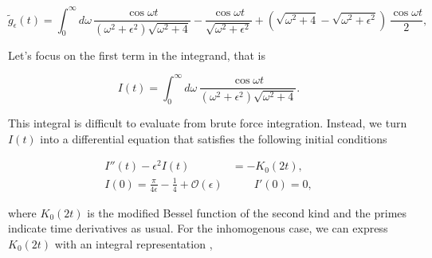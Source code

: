 \documentclass{article}
\numberwithin{equation}{section} %
\begin{document}

\begin{equation}
\tilde{g}_\epsilon(t) = \int^\infty_0 d\omega\, \frac{\cos\omega t}{(\omega^2+\epsilon^2)\sqrt{\omega^2+4}} - \frac{\cos \omega t}{\sqrt{\omega^2+\epsilon^2}} + (\sqrt{\omega^2+4} - \sqrt{\omega^2+\epsilon^2}) \, \frac{\cos \omega t}{2},
\label{g_epsilon}
\end{equation}

Let's focus on the first term in the integrand, that is

\begin{equation}
I(t) = \int^\infty_0 d\omega\, \frac{\cos \omega t}{(\omega^2+\epsilon^2)\sqrt{\omega^2+4}}.
\end{equation}

\noindent This integral is difficult to evaluate from brute force integration. Instead, we turn $I(t)$ into a differential equation that satisfies the following initial conditions

\begin{equation}
\begin{split}
I''(t) - \epsilon^2I(t) &= -K_0(2t),\\
I(0) = \frac{\pi}{4\epsilon} - \frac{1}{4} + \mathcal{O}(\epsilon) &\quad \quad I'(0) = 0,
\end{split}
\label{diff eq I}
\end{equation}

\noindent where $K_0(2t)$ is the modified Bessel function of the second kind\cite{bessel} and the primes indicate time derivatives as usual. For the inhomogenous case, we can express $K_0(2t)$ with an integral representation \cite{bessel},
\end{document}
